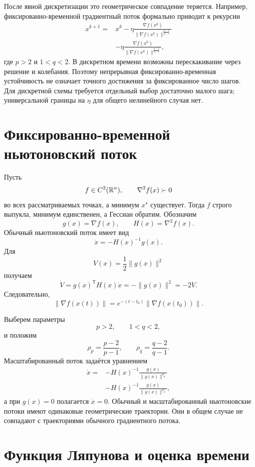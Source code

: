 После явной дискретизации это геометрическое совпадение теряется.
Например, фиксированно-временной градиентный поток формально приводит
к рекурсии
\[
\begin{aligned}
    x^{k+1}
    ={}&
    x^k
    -\eta
    \frac{\nabla f(x^k)}{
        \lVert\nabla f(x^k)\rVert^{\frac{p-2}{p-1}}
    }
    \\
    &-\eta
    \frac{\nabla f(x^k)}{
        \lVert\nabla f(x^k)\rVert^{\frac{q-2}{q-1}}
    },
\end{aligned}
\]
где \(p>2\) и \(1<q<2\). В дискретном времени возможны
перескакивание через решение и колебания. Поэтому непрерывная
фиксированно-временная устойчивость не означает точного достижения за
фиксированное число шагов. Для дискретной схемы требуется отдельный выбор достаточно малого шага; универсальной границы на \(\eta\) для общего нелинейного случая нет.

\section{Фиксированно-временной ньютоновский поток}

Пусть
\[
    f\in C^2(\mathbb{R}^n),
    \qquad
    \nabla^2f(x)\succ0
\]
во всех рассматриваемых точках, а минимум \(x^\star\) существует.
Тогда \(f\) строго выпукла, минимум единственен, а Гессиан обратим.
Обозначим
\[
    g(x)=\nabla f(x),
    \qquad
    H(x)=\nabla^2f(x).
\]
Обычный ньютоновский поток имеет вид
\[
    \dot x=-H(x)^{-1}g(x).
\]
Для
\[
    V(x)=\frac12\lVert g(x)\rVert^2
\]
получаем
\[
    \dot V
    =
    g(x)^{\mathsf T}H(x)\dot x
    =
    -\lVert g(x)\rVert^2
    =
    -2V.
\]
Следовательно,
\[
    \lVert\nabla f(x(t))\rVert
    =
    e^{-(t-t_0)}
    \lVert\nabla f(x(t_0))\rVert.
\]

Выберем параметры
\[
    p>2,
    \qquad
    1<q<2,
\]
и положим
\[
    \rho_p=\frac{p-2}{p-1},
    \qquad
    \rho_q=\frac{q-2}{q-1}.
\]
Масштабированный поток задаётся уравнением
\[
\begin{aligned}
    \dot x
    ={}&
    -H(x)^{-1}
    \frac{g(x)}{\lVert g(x)\rVert^{\rho_p}}
    \\
    &-
    H(x)^{-1}
    \frac{g(x)}{\lVert g(x)\rVert^{\rho_q}},
\end{aligned}
\]
а при \(g(x)=0\) полагается \(\dot x=0\). Обычный и
масштабированный ньютоновские потоки имеют одинаковые геометрические
траектории. Они в общем случае не совпадают с траекториями обычного
градиентного потока.

\section{Функция Ляпунова и оценка времени}


